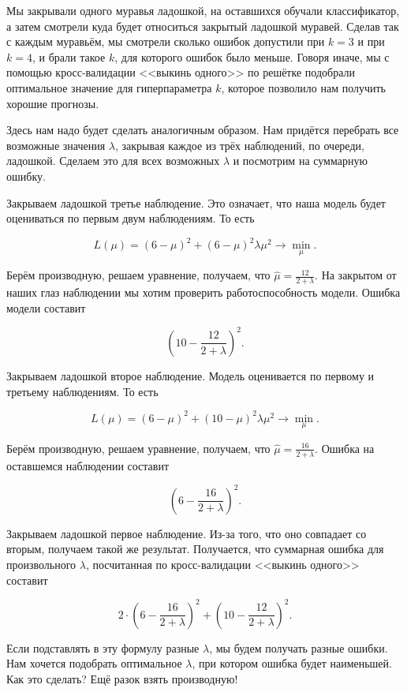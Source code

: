 \documentclass[12pt, a4paper, oneside]{article}
\begin{document}
{\begin{enumerate}
	Мы закрывали одного муравья ладошкой, на оставшихся обучали классификатор, а затем смотрели куда будет относиться закрытый ладошкой муравей. Сделав так с каждым муравьём, мы смотрели сколько ошибок допустили при $k=3$ и при $k=4$, и брали такое $k$, для которого ошибок было меньше. Говоря иначе, мы с помощью кросс-валидации <<выкинь одного>> по решётке подобрали оптимальное значение для гиперпараметра $k$, которое позволило нам получить хорошие прогнозы.
	
	Здесь нам надо будет сделать аналогичным образом.  Нам придётся перебрать все возможные значения $\lambda$, закрывая каждое из трёх наблюдений, по очереди, ладошкой.  Сделаем это для всех возможных $\lambda$ и посмотрим на суммарную ошибку. 
	
	Закрываем ладошкой третье наблюдение. Это означает, что наша модель будет оцениваться по первым двум наблюдениям. То есть
	
	\[L(\mu) = (6 - \mu)^2 + (6 -  \mu)^2  \lambda \mu^2 \to \min_{ \mu}.\]
	
	Берём производную, решаем уравнение, получаем, что $\hat \mu = \frac{12}{2 + \lambda}$. На закрытом от наших глаз наблюдении мы хотим проверить работоспособность модели. Ошибка модели составит
	
	\[ \left( 10 - \frac{12}{2 + \lambda}  \right)^2. \] 
	
	Закрываем ладошкой второе наблюдение. Модель оценивается по первому и третьему наблюдениям. То есть
	
		\[L(\mu) = (6 - \mu)^2 + (10 -   \mu)^2  \lambda \mu^2 \to \min_{ \mu}.\]
		
	Берём производную, решаем уравнение, получаем, что $\hat \mu = \frac{16}{2 + \lambda}$. Ошибка на оставшемся наблюдении составит
	
		\[ \left( 6 - \frac{16}{2 + \lambda}  \right)^2. \] 
	
	Закрываем ладошкой первое наблюдение. Из-за того, что оно совпадает со вторым, получаем такой же результат. Получается, что суммарная ошибка для произвольного $\lambda$, посчитанная по кросс-валидации <<выкинь одного>> составит 
	
	\[ 2\cdot \left( 6 - \frac{16}{2 + \lambda}  \right)^2  +  \left(10 -  \frac{12}{2 + \lambda}  \right)^2. \]	

	Если подставлять в эту формулу разные $\lambda$, мы будем получать разные ошибки. Нам хочется подобрать оптимальное $\lambda$, при котором ошибка будет наименьшей. Как это сделать? Ещё разок взять производную! 
	

\end{enumerate}}
\end{document}
